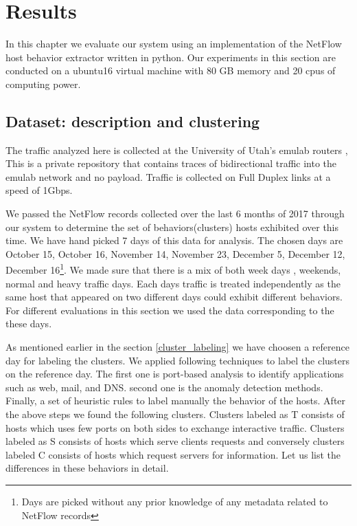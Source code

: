 
\chapter{Results}

In this chapter we evaluate our system using an implementation of the NetFlow host behavior extractor written in python. Our experiments in this section are conducted on a ubuntu16 virtual machine with 80 GB memory and 20 cpus of computing power. 

\section{Dataset: description and clustering}
The traffic analyzed here is collected at the University of Utah's emulab routers \cite{White+:osdi02}, This is a private repository that contains traces of bidirectional traffic into the emulab network and no payload. Traffic is collected on Full Duplex links at a speed of 1Gbps.

We passed the NetFlow records collected over the last 6 months of 2017 through our system to determine the set of behaviors(clusters) hosts exhibited over this time. We have hand picked 7 days of this data for analysis. The chosen days are October 15, October 16, November 14, November 23, December 5, December 12, December 16\footnote{Days are picked without any prior knowledge of any metadata related to NetFlow records}. We made sure that there is a mix of both week days , weekends, normal and heavy traffic days. Each days traffic is treated independently as the same host that appeared on two different days could exhibit different behaviors. For different evaluations in this section we used the data corresponding to the these days.

As mentioned earlier in the section \ref{cluster_labeling} we have choosen a reference day for labeling the clusters. We applied following techniques to label the clusters on the reference day. The first one is port-based analysis to identify applications such as web, mail, and DNS. second one is the anomaly detection methods. Finally, a set of heuristic rules to label manually the behavior of the hosts. After the above steps we found the following clusters. Clusters labeled as T consists of hosts which uses few ports on both sides to exchange interactive traffic. Clusters labeled as S consists of hosts which serve clients requests and conversely clusters labeled C consists of hosts which request servers for information. Let us list the differences in these behaviors in detail.

